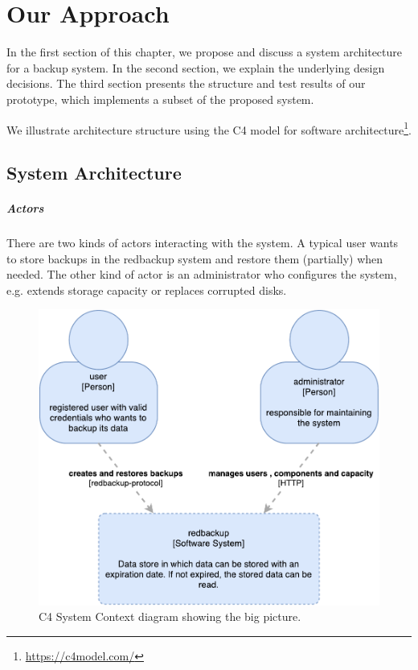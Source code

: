 \chapter{Our Approach}
\label{sec:our-approach}

In the first section of this chapter, we propose and discuss a system architecture for a backup system. In the second section, we explain the underlying design decisions. The third section presents the structure and test results of our prototype, which implements a subset of the proposed system.

We illustrate architecture structure using the C4 model for software architecture\footnote{\url{https://c4model.com/}}.

\section{System Architecture}

\paragraph{Actors} There are two kinds of actors interacting with the system. A typical \gls{user} wants to store backups in the redbackup system and restore them (partially) when needed. The other kind of actor is an \gls{administrator} who configures the system, e.g. extends storage capacity or replaces corrupted disks.

\begin{figure}[h]
	\centering
	\includegraphics[width=0.8\linewidth]{resources/c4-overview}
	\caption[C4 System Context Diagram]{C4 System Context diagram showing the big picture.}
	\label{fig:c4-overview}
\end{figure}

